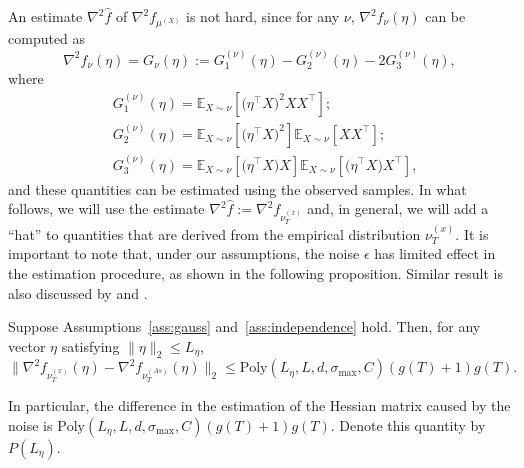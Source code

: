 \documentclass[twoside,11pt]{article}
\newcommand{\E}{\mathbb{E}}
\begin{document}
An estimate $\nabla^2 \hat{f}$ of $\nabla^2f_{\mu^{(X)}}$ is not hard, since for any $\nu$,
$\nabla^2f_{\nu}(\eta)$  can be computed as
\begin{equation}
\label{eq:G}
\nabla^2 f_{\nu}(\eta) = G_{\nu}(\eta):= G_1^{(\nu)}(\eta) - G_2^{(\nu)}(\eta) -2G_3^{(\nu)}(\eta),
\end{equation}
where 
\begin{align*}
& G_1^{(\nu)}(\eta) =  \E_{X\sim \nu} [\big(\eta^{\top}X\big)^2XX^{\top}]; \\
& G_2^{(\nu)}(\eta) = \E_{X\sim \nu} [\big(\eta^{\top}X\big)^2] \E_{X\sim \nu} [XX^{\top}]; \\
& G_3^{(\nu)}(\eta) = \E_{X\sim \nu} [\big(\eta^{\top}X\big)X] \E_{X\sim \nu} [\big(\eta^{\top}X\big)X^{\top}],
\end{align*} 
and these quantities can be estimated using the observed samples. In what follows, we will use the estimate $\nabla^2 \hat{f}:=\nabla^2 f_{\nu_T^{(x)}}$ and, in general, we will add a ``hat'' to quantities that are derived from the empirical distribution $\nu_T^{(x)}$. 
It is important to note that, under our assumptions, the noise $\epsilon$ has limited effect in the estimation procedure, as shown in the following proposition. Similar result is also discussed by \citet{arora2012provable} and \citet{belkin2013blind}.
\begin{proposition}
 \label{prop:denoise}
 Suppose Assumptions~\ref{ass:gauss} and~\ref{ass:independence} hold. Then,
for any vector $\eta$ satisfying $\|\eta\|_2\le L_{\eta}$,
\[
\| \nabla^2f_{\nu_T^{(x)}}(\eta) - \nabla^2f_{\nu_T^{(As)}}(\eta) \|_2 \le \text{Poly}(L_{\eta}, L, d, \sigma_{\max}, C)(g(T)+1)g(T). 
\] 
\end{proposition}

In particular, the difference in the estimation of the Hessian matrix caused by the noise is $\text{Poly}(L_{\eta}, L, d, \sigma_{\max}, C)(g(T)+1)g(T)$. Denote this quantity by $P(L_{\eta})$. 
\end{document}
